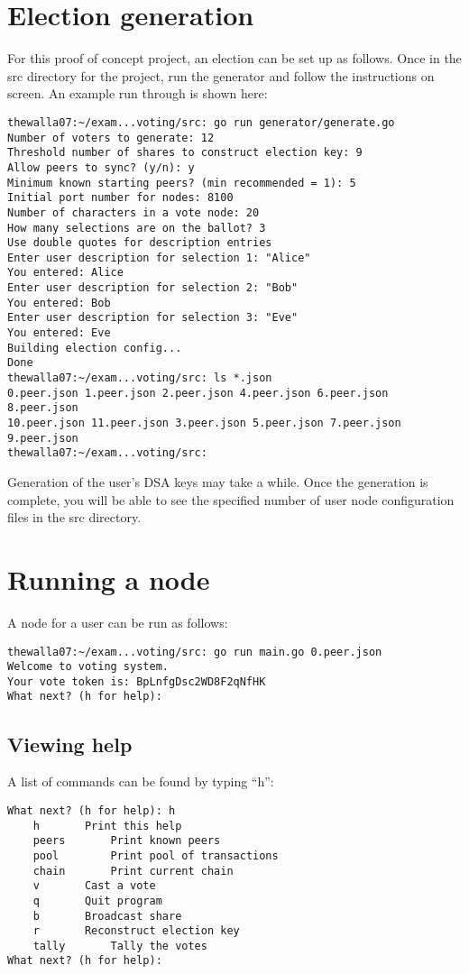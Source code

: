 \documentclass[a4paper,12pt]{article}
\begin{document}
\section{Election generation}
For this proof of concept project, an election can be set up as follows. Once in the src directory for the project, run the generator and follow the instructions on screen. An example run through is shown here:

\begin{verbatim}
thewalla07:~/exam...voting/src: go run generator/generate.go
Number of voters to generate: 12
Threshold number of shares to construct election key: 9
Allow peers to sync? (y/n): y
Minimum known starting peers? (min recommended = 1): 5
Initial port number for nodes: 8100
Number of characters in a vote node: 20
How many selections are on the ballot? 3
Use double quotes for description entries
Enter user description for selection 1: "Alice"
You entered: Alice
Enter user description for selection 2: "Bob"
You entered: Bob
Enter user description for selection 3: "Eve"
You entered: Eve
Building election config...
Done
thewalla07:~/exam...voting/src: ls *.json
0.peer.json 1.peer.json 2.peer.json 4.peer.json 6.peer.json 8.peer.json
10.peer.json 11.peer.json 3.peer.json 5.peer.json 7.peer.json 9.peer.json
thewalla07:~/exam...voting/src:
\end{verbatim}

Generation of the user's DSA keys may take a while. Once the generation is complete, you will be able to see the specified number of user node configuration files in the src directory.

\section{Running a node}
A node for a user can be run as follows:
\begin{verbatim}
thewalla07:~/exam...voting/src: go run main.go 0.peer.json
Welcome to voting system.
Your vote token is: BpLnfgDsc2WD8F2qNfHK
What next? (h for help):
\end{verbatim}

\subsection{Viewing help}
A list of commands can be found by typing ``h'':
\begin{Verbatim}[obeytabs,tabsize=4]
What next? (h for help): h
	h		Print this help
	peers		Print known peers
	pool		Print pool of transactions
	chain		Print current chain
	v		Cast a vote
	q		Quit program
	b		Broadcast share
	r		Reconstruct election key
	tally		Tally the votes
What next? (h for help):
\end{Verbatim}
\end{document}
